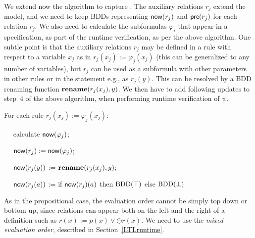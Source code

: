 




We extend now the algorithm to capture \EPFLTL{}.
The auxiliary relations $r_j$ extend the model, and we need to keep 
BDDs representing $\mathsf{now} ( r_j )$ and
$\mathsf{pre} (r_j)$ for each relation $r_j$. We also need to calculate the 
subformulas $\varphi_i$ that appear in
a specification, as part of the runtime verification,
as per the above \PFLTL{} algorithm. One subtle point is that the auxiliary 
relations $r_j$ may be defined in a rule with respect to
a variable $x_j$ as in $r_j (x_j ):= \varphi_j (x_j)$ (this can be generalized 
to any number of variables), but $r_j$ can be used
as a subformula with other parameters in other rules or in the statement e.g., 
as $r_j ( y )$. This can be resolved by a BDD renaming function 
$\mathbf{rename} ( r_j (x_j ) , y)$.
%
We then have to add
following updates to step~4 of the above algorithm, when performing runtime verification of
$\psi$. 

\noindent \begin{description}
\item For each rule 
$r_j ( x_j ) := \varphi_j ( x_j )$:
\item{\ \ }  calculate $\mathsf{now} ( \varphi_j )$;
\item{\ \ }  $\mathsf{now} ( r_j )  := \mathsf{now} (\varphi_j)$;
\item{\ \ } $\mathsf{now} ( r_j ( y ) )$ := $\mathbf{rename} ( r_j(x_j) ,  y )$;
\item{\ \ } $\mathsf{now} ( r_j ( a ) )$ := if $\mathsf{now} ( r_j ) ( a )$
then $\mathrm{BDD}(\top)$ else $\mathrm{BDD}(\bot)$
\end{description}


\noindent
As in the propositional case, the evaluation order cannot be
simply top down or bottom up, since relations can appear
both on the left and the right of a definition
such as $r ( x ) := p ( x ) \vee \ominus r ( x )$. 
We need to use the {\em mixed evaluation order}, described in Section~\ref{LTLruntime}.


